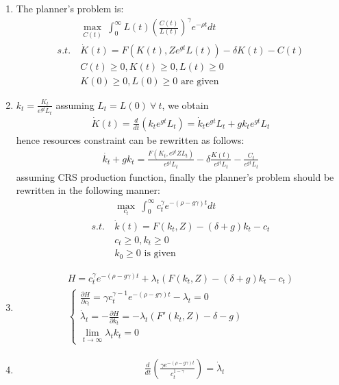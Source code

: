 \documentclass[a4paper]{article}
\begin{document}
\begin{enumerate}
	\item The planner's problem is:
	\begin{align*}
	&\underset{C(t)}{\max}\ \int_{0}^{\infty} L(t) \left(\frac{C(t)}{L(t)}\right)^{\gamma}e^{-\rho t}dt\\
	s.t.\ &\dot{K}(t) = F(K(t), Ze^{gt}L(t)) - \delta K(t) - C(t)\\
	&C(t) \ge 0, K(t) \ge 0, L(t) \ge 0\\
	&K(0) \ge 0, L(0) \ge 0 \text{ are given }
	\end{align*}
	\item $k_t = \frac{K_t}{e^{gt}L_t}$ assuming $L_t = L(0)\ \forall\ t$, we obtain
	\begin{align*}
	\dot{K}(t) = \frac{d}{dt}(k_te^{gt}L_t) = \dot{k}_te^{gt}L_t + gk_te^{gt}L_t
	\end{align*}
	hence resources constraint can be rewritten as follows:
	\begin{align*}
	\dot{k_t} + gk_t = \frac{F(K_t, e^{gt}ZL_t)}{e^{gt}L_t} - \delta\frac{K(t)}{e^{gt}L_t} - \frac{C_t}{e^{gt}L_t}
	\end{align*}
	 assuming CRS production function, finally the planner's problem should be rewritten in the following manner:
	\begin{align*}
	&\underset{c_t}{\max}\ \int_{0}^{\infty} c_t^{\gamma}e^{-(\rho - g \gamma)t}dt\\
	s.t.\ &\dot{k}(t) = F(k_t, Z) - (\delta+g) k_t - c_t\\
	&c_t \ge 0, k_t \ge 0\\
	&k_0 \ge 0 \text{ is given}
	\end{align*}
	\item 
	\begin{align*}
	H = c_t^{\gamma}e^{-(\rho - g\gamma)t} + \lambda_t (F(k_t, Z) - (\delta +g) k_t - c_t)\\
	\begin{cases}
	\frac{\partial H}{\partial c_t} = \gamma c_t^{\gamma - 1}e^{-(\rho - g\gamma)t} - \lambda_t = 0\\
	\dot{\lambda}_t = -\frac{\partial H}{\partial k_t} = -\lambda_t(F'(k_t, Z) - \delta - g)\\
	\lim_{t \to \infty} \lambda_tk_t = 0
	\end{cases}
	\end{align*}
	\item \begin{align*}
	&\frac{d}{dt} \left(\frac{\gamma e^{-(\rho - g\gamma)t}}{c_t^{1 - \gamma}}\right) = \dot{\lambda}_t\\

\end{align*}
\end{enumerate}
\end{document}
